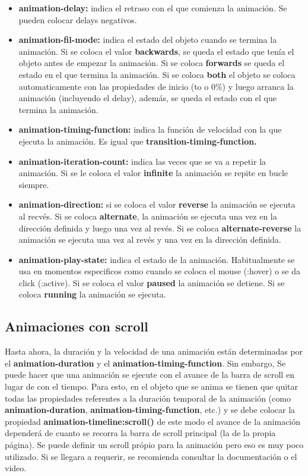 \documentclass[10pt,oneside]{article}
\begin{document}
\begin{multicols}{2}
    \begin{itemize}
        \item \textbf{animation-delay:} indica el retraso con el que comienza la animación. Se pueden colocar delays negativos.
        \item \textbf{animation-fil-mode:} indica el estado del objeto cuando se termina la animación. Si se coloca el valor \textbf{backwards}, se queda el estado que tenía el objeto antes de empezar la animación. Si se coloca \textbf{forwards} se queda el estado en el que termina la animación. Si se coloca \textbf{both} el objeto se coloca automaticamente con las propiedades de inicio (to o 0\%) y luego arranca la animación (incluyendo el delay), además, se queda el estado con el que termina la animación.  
        \item \textbf{animation-timing-function:} indica la función de velocidad con la que ejecuta la animación. Es igual que \textbf{transition-timing-function.}
        \item \textbf{animation-iteration-count:} indica las veces que se va a repetir la animación. Si se le coloca el valor \textbf{infinite} la animación se repite en bucle siempre.
        \item \textbf{animation-direction:} si se coloca el valor \textbf{reverse} la animación se ejecuta al recvés. Si se coloca \textbf{alternate}, la animación se ejecuta una vez en la dirección definida y luego una vez al revés. Si se coloca \textbf{alternate-reverse}  la animación se ejecuta una vez al revés y una vez en la dirección definida.
        \item \textbf{animation-play-state:} indica el estado de la animación. Habitualmente se usa en momentos especificos como cuando se coloca el mouse (:hover) o se da click (:active). Si se coloca el valor \textbf{paused} la animación se detiene. Si se coloca \textbf{running} la animación se ejecuta.
    \end{itemize}

\subsection{Animaciones con scroll}
    Hasta ahora, la duración y la velocidad de una animación están determinadas por el \textbf{animation-duration} y el \textbf{animation-timing-function}. Sin embargo, Se puede hacer que una animación se ejecute con el avance de la barra de scroll en lugar de con el tiempo. Para esto, en el objeto que se anima se tienen que quitar todas las propiedades referentes a la duración temporal de la animación (como \textbf{animation-duration}, \textbf{animation-timing-function}, etc.) y se debe colocar la propiedad \textbf{animation-timeline:scroll()} de este modo el avance de la animación dependerá de cuanto se recorra la barra de scroll principal (la de la propia página). Se puede definir un scroll própio para la animación pero eso es muy poco utilizado. Si se llegara a requerir, se recomienda consultar la documentación o el video. 


\end{multicols}
\end{document}
